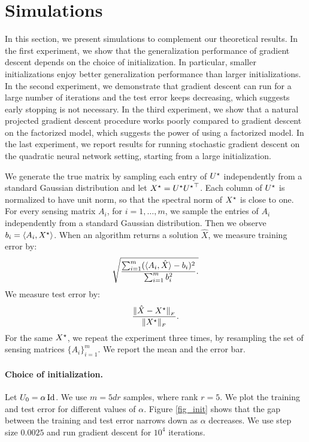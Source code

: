 
\section{Simulations}\label{sec:exp}

In this section, we present simulations to complement our theoretical results.
In the first experiment, we show that the generalization performance of gradient descent depends on the choice of initialization.
In particular, smaller initializations enjoy better generalization performance than larger initializations.
In the second experiment, we demonstrate that gradient descent can run for a large number of  iterations and the test error keeps decreasing, which suggests early stopping is not necessary. 
In the third experiment, we show that a natural projected gradient descent procedure works poorly compared to gradient descent on the factorized model, which suggests the power of using a factorized model.
In the last experiment, we report results for running stochastic gradient descent on the quadratic neural network setting, starting from a large initialization.

We generate the true matrix by sampling each entry of ${{U}^\star}$ independently from a standard Gaussian distribution and let ${X}^\star = {{U}^\star} {{U}^\star}^\top$. 
Each column of ${{U}^\star}$ is normalized to have unit norm, so that the spectral norm of ${X}^\star$ is close to one.
For every sensing matrix $A_i$, for $i = 1,\dots,m$, we sample the entries of $A_i$ independently from a standard Gaussian distribution.
Then we observe $b_i = \langle A_i, {X}^\star\rangle$.
When an algorithm returns a solution $\hat X$, we measure training error by:
\[ \sqrt{\frac{\sum_{i=1}^m (\langle A_i, \hat X\rangle - b_i)^2} {\sum_{i=1}^m b_i^2}.} \]
We measure test error by:
\[ \frac{\|\hat X - {X}^\star\|_{_{F}}} {\|{X}^\star\|_{_{F}}}. \]
For the same ${X}^\star$, we repeat the experiment three times, by resampling the set of sensing matrices $\{A_i\}_{i=1}^m$.
We report the mean and the error bar.

\paragraph{Choice of initialization.}
Let $U_0 = \alpha \operatorname{Id}$.
We use $m = 5dr$ samples, where rank $r = 5$.
We plot the training and test error for different values of $\alpha$.
Figure \ref{fig_init} shows that the gap between the training and test error
narrows down as $\alpha$ decreases.
We use step size $0.0025$ and run gradient descent for $10^4$ iterations.

